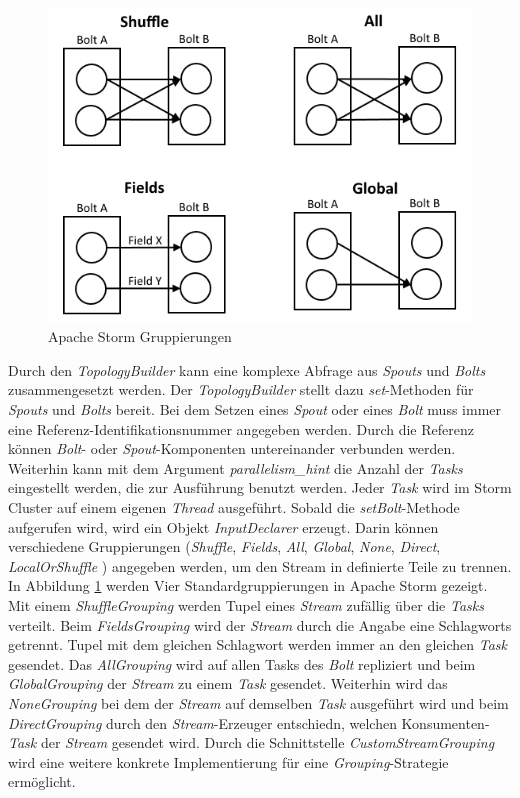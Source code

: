 \begin{figure}[htb!]
\centering
\includegraphics[width=1.0\textwidth]{bilder/stormGroupings.png}
\caption{Apache Storm Gruppierungen
\label{fig:stormGroupings}}
\end{figure}

Durch den \textit{TopologyBuilder} kann eine komplexe Abfrage aus \textit{Spouts} und \textit{Bolts} zusammengesetzt werden. Der \textit{TopologyBuilder} stellt dazu \textit{set}-Methoden für \textit{Spouts} und \textit{Bolts} bereit. Bei dem Setzen eines \textit{Spout} oder eines \textit{Bolt} muss immer eine Referenz-Identifikationsnummer angegeben werden. Durch die Referenz können \textit{Bolt}- oder \textit{Spout}-Komponenten untereinander verbunden werden. Weiterhin kann mit dem Argument \textit{parallelism\_hint} die Anzahl der \textit{Tasks} eingestellt werden, die zur Ausführung benutzt werden. Jeder \textit{Task} wird im Storm Cluster auf einem eigenen \textit{Thread} ausgeführt. Sobald die \textit{setBolt}-Methode aufgerufen wird, wird ein Objekt \textit{InputDeclarer} erzeugt. Darin können verschiedene Gruppierungen (\textit{Shuffle}, \textit{Fields}, \textit{All}, \textit{Global}, \textit{None}, \textit{Direct}, \textit{LocalOrShuffle} ) angegeben werden, um den Stream in definierte Teile zu trennen. In Abbildung \ref{fig:stormGroupings} werden Vier Standardgruppierungen in Apache Storm gezeigt. Mit einem \textit{ShuffleGrouping} werden Tupel eines \textit{Stream} zufällig über die \textit{Tasks} verteilt. Beim \textit{FieldsGrouping} wird der \textit{Stream} durch die Angabe eine Schlagworts getrennt. Tupel mit dem gleichen Schlagwort werden immer an den gleichen \textit{Task} gesendet. Das \textit{AllGrouping} wird auf allen Tasks des \textit{Bolt} repliziert und beim \textit{GlobalGrouping} der \textit{Stream} zu einem \textit{Task} gesendet. Weiterhin wird das \textit{NoneGrouping} bei dem der \textit{Stream} auf demselben \textit{Task} ausgeführt wird und beim \textit{DirectGrouping} durch den \textit{Stream}-Erzeuger entschiedn, welchen Konsumenten-\textit{Task} der \textit{Stream} gesendet wird. Durch die Schnittstelle \textit{CustomStreamGrouping} wird eine weitere konkrete Implementierung für eine \textit{Grouping}-Strategie ermöglicht. 

